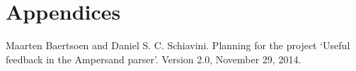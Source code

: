 
\part*{Appendices}
\appendix

\label{sec:bibliography}

\begin{thebibliography}{99}

	Maarten Baertsoen and Daniel S. C. Schiavini.
	Planning for the project `Useful feedback in the Ampersand parser'.
	Version 2.0, November 29, 2014.

\end{thebibliography}

